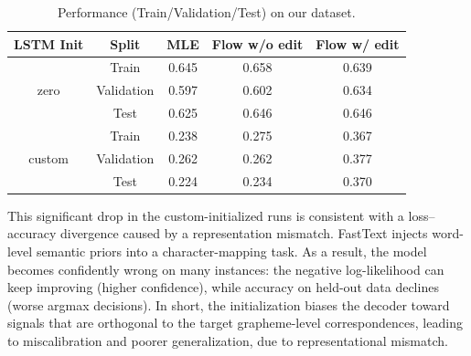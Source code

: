 \begin{table}[h!]
\centering
\begin{tabular}{|c|c|c|c|c|}
\hline
\textbf{LSTM Init} & \textbf{Split} & \textbf{MLE} & \textbf{Flow w/o edit} & \textbf{Flow w/ edit} \\
\hline
\multirow{3}{*}{zero}
& Train      & 0.645 & 0.658 & 0.639 \\
& Validation & 0.597 & 0.602 & 0.634 \\
& Test       & 0.625 & 0.646 & 0.646 \\
\hline
\multirow{3}{*}{custom}
& Train      & 0.238 & 0.275 & 0.367 \\
& Validation & 0.262 & 0.262 & 0.377 \\
& Test       & 0.224 & 0.234 & 0.370 \\
\hline
\end{tabular}
\caption{Performance (Train/Validation/Test) on our dataset.}
\end{table}

This significant drop in the custom-initialized runs is consistent with a loss–accuracy divergence caused by a representation mismatch.
FastText injects word-level semantic priors into a character-mapping task.
As a result, the model becomes confidently wrong on many instances: the negative log-likelihood can keep improving (higher confidence), while accuracy on held-out data declines (worse argmax decisions).
In short, the initialization biases the decoder toward signals that are orthogonal to the target grapheme-level correspondences, leading to miscalibration and poorer generalization, due to representational mismatch.

